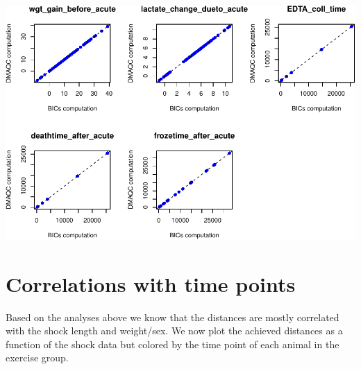 \documentclass[]{article}
\newenvironment{Shaded}{\begin{snugshade}}{\end{snugshade}}
\newcommand{\KeywordTok}[1]{\textcolor[rgb]{0.13,0.29,0.53}{\textbf{#1}}}
\newcommand{\DataTypeTok}[1]{\textcolor[rgb]{0.13,0.29,0.53}{#1}}
\newcommand{\DecValTok}[1]{\textcolor[rgb]{0.00,0.00,0.81}{#1}}
\newcommand{\StringTok}[1]{\textcolor[rgb]{0.31,0.60,0.02}{#1}}
\newcommand{\CommentTok}[1]{\textcolor[rgb]{0.56,0.35,0.01}{\textit{#1}}}
\newcommand{\OperatorTok}[1]{\textcolor[rgb]{0.81,0.36,0.00}{\textbf{#1}}}
\newcommand{\NormalTok}[1]{#1}
\begin{document}
\begin{Shaded}
\end{Shaded}

\begin{center}\includegraphics[width=0.9\linewidth,height=0.9\textheight]{pheno_csv_files_analysis_files/figure-latex/unnamed-chunk-7-1} \end{center}

\section{Correlations with time
points}\label{correlations-with-time-points}

Based on the analyses above we know that the distances are mostly
correlated with the shock length and weight/sex. We now plot the
achieved distances as a function of the shock data but colored by the
time point of each animal in the exercise group.
\end{document}
